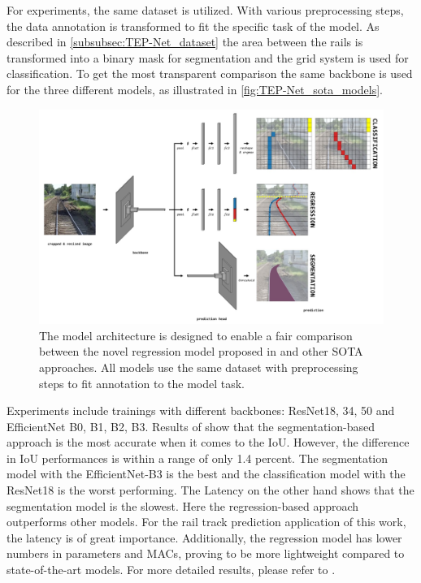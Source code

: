 For experiments, the same dataset is utilized.
With various preprocessing steps, the data annotation is transformed to fit the specific task of the model.
As described in \autoref{subsubsec:TEP-Net_dataset} the area between the rails is transformed into a binary mask for segmentation and the grid system is used for classification.
To get the most transparent comparison the same backbone is used for the three different models, as illustrated in \autoref{fig:TEP-Net_sota_models}.

\begin{figure}[H]
    \centering
    \includegraphics[width=\linewidth]{PICs/Baselinepaper/tep-net_sota_models.jpg}
    \caption{The model architecture is designed to enable a fair comparison between the novel regression model proposed in \cite{tepNet2024} and other \ac{SOTA} approaches.
    All models use the same dataset with preprocessing steps to fit annotation to the model task.}
    \label{fig:TEP-Net_sota_models}
\end{figure}

Experiments include trainings with different backbones: ResNet18, 34, 50 and EfficientNet B0, B1, B2, B3.
Results of \cite{tepNet2024} show that the segmentation-based approach is the most accurate when it comes to the \ac{IoU}.
However, the difference in \ac{IoU} performances is within a range of only 1.4 percent.
The segmentation model with the EfficientNet-B3 is the best and the classification model with the ResNet18 is the worst performing.
The Latency on the other hand shows that the segmentation model is the slowest.
Here the regression-based approach outperforms other models.
For the rail track prediction application of this work, the latency is of great importance.
Additionally, the regression model has lower numbers in parameters and \ac{MACs}, proving to be more lightweight compared to state-of-the-art models.
For more detailed results, please refer to \cite{tepNet2024}.


